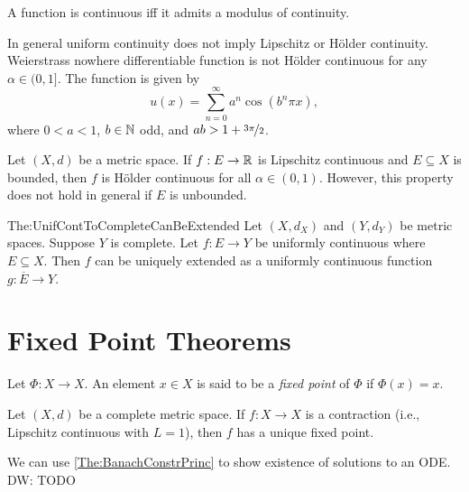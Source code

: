 \documentclass[screen,single]{techreport}
\numberwithin{equation}{section}
\newcommand{\diw}[1]{{\color{Red} DW: #1}}
\begin{document}
\begin{proposition}\label{Prop:UnifContIffModCont}
  A function is continuous iff it admits a modulus of continuity.
\end{proposition}

\begin{remark}\label{Rem:UnifContNotImplyLipHolder}
  In general uniform continuity does not imply Lipschitz or H{\"o}lder continuity.
  Weierstrass nowhere differentiable function is not H{\"o}lder continuous for any $\alpha \in (0,1]$.
  The function is given by
  \[
  u(x) = \sum_{n=0}^\infty a^n \cos(b^n \pi x),
  \]
  where $0 < a < 1$, $b \in \mathbb{N}$ odd, and $ab > 1 + \nicefrac{3\pi}{2}$.
\end{remark}

\begin{remark}\label{Rem:LipImplyHolder}
  Let $(X,d)$ be a metric space.
  If $f : E \to \mathbb{R}$ is Lipschitz continuous and $E \subseteq X$ is bounded, then $f$ is H{\"o}lder continuous for all $\alpha \in (0,1)$.
  However, this property does not hold in general if $E$ is unbounded.
\end{remark}

\begin{theorem}{The:UnifContToCompleteCanBeExtended}
  Let $(X,d_X)$ and $(Y,d_Y)$ be metric spaces.
  Suppose $Y$ is complete.
  Let $f : E \to Y$ be uniformly continuous where $E \subseteq X$.
  Then $f$ can be uniquely extended as a uniformly continuous function $g : \overline{E} \to Y$.
\end{theorem}

\section{Fixed Point Theorems}

\begin{definition}\label{De:FixedPoint}
  Let $\Phi : X \to X$.
  An element $x \in X$ is said to be a \emph{fixed point} of $\Phi$ if $\Phi(x) = x$.
\end{definition}

\begin{theorem}\label{The:BanachConstrPrinc}
  Let $(X,d)$ be a complete metric space.
  If $f : X \to X$ is a contraction (i.e., Lipschitz continuous with $L=1$), then $f$ has a unique fixed point.
\end{theorem}

\begin{example}\label{Exa:SolvingIVP}
  We can use \cref{The:BanachConstrPrinc} to show existence of solutions to an ODE.
  \diw{TODO}
\end{example}
\end{document}

